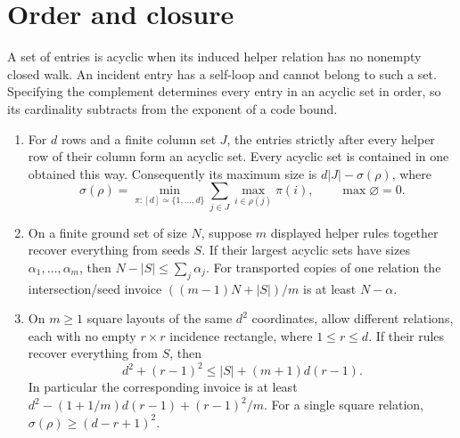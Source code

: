 \section{Order and closure}\label{sec:order}

A set of entries is acyclic when its induced helper relation has no nonempty closed walk. An incident entry has a
self-loop and cannot belong to such a set. Specifying the complement determines every entry in an acyclic set in
order, so its cardinality subtracts from the exponent of a code bound.

\begin{theorem}\label{thm:O}
\begin{enumerate}[label=(\alph*),leftmargin=2em]
\item For $d$ rows and a finite column set $J$, the entries strictly after every helper row of their column form an
acyclic set. Every acyclic set is contained in one obtained this way. Consequently its maximum size is
$d|J|-\sigma(\rho)$, where
\[
 \sigma(\rho)=\min_{\pi:[d]\simeq\{1,\ldots,d\}}
                 \sum_{j\in J}\max_{i\in\rho(j)}\pi(i),\qquad \max\varnothing=0.
\]
\item On a finite ground set of size $N$, suppose $m$ displayed helper rules together recover everything from seeds
$S$. If their largest acyclic sets have sizes $\alpha_1,\ldots,\alpha_m$, then
$N-|S|\le\sum_j\alpha_j$. For transported copies of one relation the intersection/seed invoice
$((m-1)N+|S|)/m$ is at least $N-\alpha$.
\item On $m\ge1$ square layouts of the same $d^2$ coordinates, allow different relations, each with no empty
$r\times r$ incidence rectangle, where $1\le r\le d$. If their rules recover everything from $S$, then
\[
 d^2+(r-1)^2\le |S|+(m+1)d(r-1).
\]
In particular the corresponding invoice is at least
$d^2-(1+1/m)d(r-1)+(r-1)^2/m$. For a single square relation,
$\sigma(\rho)\ge(d-r+1)^2$.
\end{enumerate}
\end{theorem}
